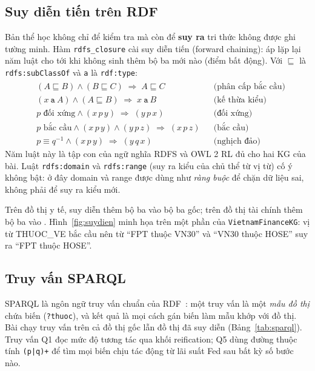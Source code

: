 \subsection{Suy diễn tiến trên RDF}
Bản thể học không chỉ để kiểm tra mà còn để \textbf{suy ra} tri thức không được ghi tường minh. Hàm
\texttt{rdfs\_closure} cài suy diễn tiến (forward chaining): áp lặp lại năm luật cho tới khi không sinh thêm bộ ba
mới nào (điểm bất động). Với $\sqsubseteq$ là \texttt{rdfs:subClassOf} và \texttt{a} là \texttt{rdf:type}:
\begin{align}
  &(A \sqsubseteq B) \wedge (B \sqsubseteq C) \;\Rightarrow\; A \sqsubseteq C &&\text{(phân cấp bắc cầu)}\\
  &(x\ \texttt{a}\ A) \wedge (A \sqsubseteq B) \;\Rightarrow\; x\ \texttt{a}\ B &&\text{(kế thừa kiểu)}\\
  &p \text{ đối xứng} \wedge (x\, p\, y) \;\Rightarrow\; (y\, p\, x) &&\text{(đối xứng)}\\
  &p \text{ bắc cầu} \wedge (x\, p\, y) \wedge (y\, p\, z) \;\Rightarrow\; (x\, p\, z) &&\text{(bắc cầu)}\\
  &p \equiv q^{-1} \wedge (x\, p\, y) \;\Rightarrow\; (y\, q\, x) &&\text{(nghịch đảo)}
\end{align}
Năm luật này là tập con của ngữ nghĩa RDFS và OWL 2 RL đủ cho hai KG của bài. Luật \texttt{rdfs:domain} và
\texttt{rdfs:range} (suy ra kiểu của chủ thể từ vị từ) cố ý không bật: ở đây domain và range được dùng như
\emph{ràng buộc} để chặn dữ liệu sai, không phải để suy ra kiểu mới.


Trên đồ thị y tế, suy diễn thêm  bộ ba vào  bộ ba gốc; trên
đồ thị tài chính thêm  bộ ba vào . Hình~\ref{fig:suydien}
minh họa trên một phần của \texttt{VietnamFinanceKG}: vị từ \textsf{THUOC\_VE} bắc cầu nên từ
``FPT thuộc VN30'' và ``VN30 thuộc HOSE'' suy ra ``FPT thuộc HOSE''.


\subsection{Truy vấn SPARQL}
SPARQL là ngôn ngữ truy vấn chuẩn của RDF~\cite{w3c2013sparql}: một truy vấn là một \emph{mẫu đồ thị} chứa biến
(\texttt{?thuoc}), và kết quả là mọi cách gán biến làm mẫu khớp với đồ thị. Bài chạy  truy vấn
trên cả đồ thị gốc lẫn đồ thị đã suy diễn (Bảng~\ref{tab:sparql}). Truy vấn Q1 đọc mức độ tương tác qua khối
reification; Q5 dùng đường thuộc tính \texttt{(p|q)+} để tìm mọi biến chịu tác động từ lãi suất Fed sau bất kỳ số
bước nào.

